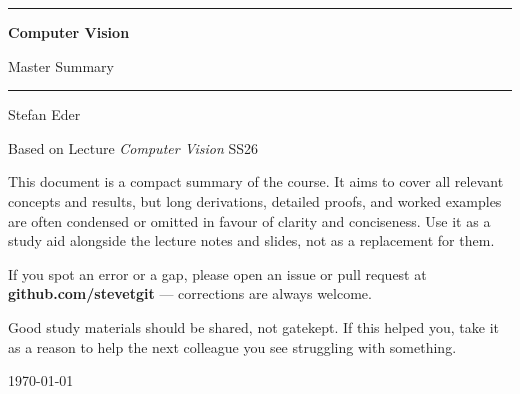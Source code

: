 \documentclass[11pt, oneside]{book}
\newcommand{\coursetitle}{Computer Vision}
\newcommand{\documenttype}{Master Summary}
\newcommand{\authorname}{Stefan Eder}
\newcommand{\basedon}{Based on Lecture \emph{Computer Vision} SS26}
\begin{document}
\frontmatter


\thispagestyle{empty}
\vspace*{1.8cm}

\begin{center}
  {\color{accent}\rule{\linewidth}{1.8pt}}
  \vspace{0.65cm}

  {\fontsize{28}{34}\selectfont\bfseries\color{accent}\coursetitle\par}
  \vspace{0.25cm}
  {\large\color{gray!80!black}\documenttype\par}

  \vspace{0.55cm}
  {\color{accent!35}\rule{\linewidth}{0.5pt}}
  \vspace{0.55cm}

  {\large\authorname\par}
  \vspace{0.2cm}
  {\small\color{gray!70}\basedon\par}
\end{center}

\vspace{1.6cm}

\begin{center}
\begin{minipage}{0.84\textwidth}
  \small\color{gray!80!black}
  This document is a compact summary of the course.
  It aims to cover all relevant concepts and results, but long derivations,
  detailed proofs, and worked examples are often condensed or omitted in
  favour of clarity and conciseness.
  Use it as a study aid alongside the lecture notes and slides, not as a
  replacement for them.

  \medskip
  If you spot an error or a gap, please open an issue or pull request at
  \textbf{github.com/stevetgit} --- corrections are always welcome.

  \medskip
  \color{gray!60!black}
  Good study materials should be shared, not gatekept.
  If this helped you, take it as a reason to help the next colleague you see struggling with something.
\end{minipage}
\end{center}

\vfill
{\centering\small\color{gray!65} \today\par}
\clearpage
\end{document}
